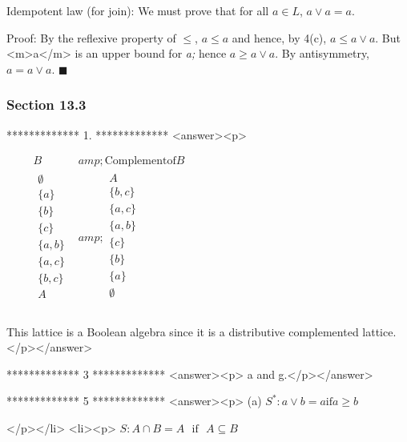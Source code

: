Idempotent law (for join): We must prove that for all \(a \in  L\), \(a \lor  a = a\). 



Proof: By the reflexive property of $\leq $, \(a \leq  a\) and hence, by 4(c), \(a\leq a\lor a\).  But <m>a</m> is an upper bound for \textit{
a;} hence \(a\geq a\lor a\).  By antisymmetry, \(a = a \lor  a\).   $\blacksquare $


\subsubsection{Section 13.3}

*************
1.
*************
<answer><p> 



$\quad \quad $\(\begin{array}{cc}
 B &amp; \text{Complement} \text{of} B \\
\hline
 
\begin{array}{c}
 \emptyset  \\
 \{a\} \\
 \{b\} \\
 \{c\} \\
 \{a,b\} \\
 \{a,c\} \\
 \{b,c\} \\
 A \\
\end{array}
 &amp; 
\begin{array}{c}
 A \\
 \{b,c\} \\
 \{a,c\} \\
 \{a,b\} \\
 \{c\} \\
 \{b\} \\
 \{a\} \\
 \emptyset  \\
\end{array}
 \\
\end{array}\)



This lattice is a Boolean algebra since it is a distributive complemented lattice.</p></answer>


*************
3
*************
<answer><p>   a and g.</p></answer>


*************
5
*************
<answer><p> (a) \(S^*:a \lor  b= a \text{if} a \geq  b\)

</p></li>
<li><p> \(S:A\cap B = A\text{  }\text{if}\text{  }A \subseteq B\)



